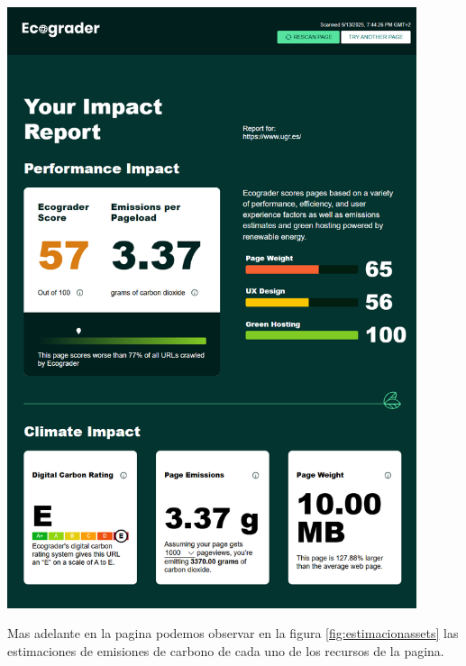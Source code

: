 \documentclass[12pt,a4paper]{report}
\begin{document}
\begin{center}
  \includegraphics[width=0.9\textwidth]{imagenes/Ecograder_2.png}
  \label{fig:ecograderresults}
\end{center}

Mas adelante en la pagina podemos observar en la figura \ref{fig:estimacionassets} las estimaciones de emisiones de carbono de cada uno de los recursos de la pagina.
\end{document}
